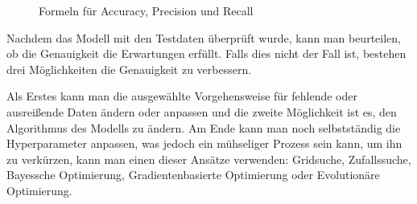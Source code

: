 \begin{enumerate}
\begin{figure}[H]
                  \caption{Formeln für Accuracy, Precision und Recall}
            \end{figure}

            Nachdem das Modell mit den Testdaten überprüft wurde, kann man beurteilen, ob die Genauigkeit die Erwartungen erfüllt. Falls dies nicht der Fall ist, bestehen drei Möglichkeiten die Genauigkeit zu verbessern.

            Als Erstes kann man die ausgewählte Vorgehensweise für fehlende oder ausreißende Daten ändern oder anpassen und die zweite Möglichkeit ist es, den Algorithmus des Modells zu ändern. Am Ende kann man noch selbstständig die Hyperparameter anpassen, was jedoch ein mühseliger Prozess sein kann, um ihn zu verkürzen, kann man einen dieser Ansätze verwenden: Gridsuche, Zufallssuche, Bayessche Optimierung, Gradientenbasierte Optimierung oder Evolutionäre Optimierung. \cite{MLkg}
\end{enumerate}